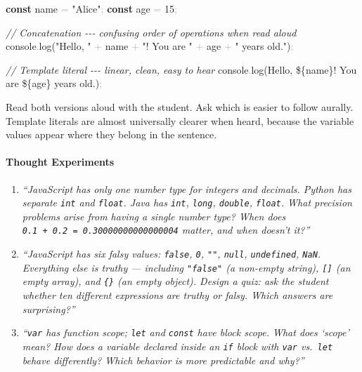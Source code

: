 \documentclass[
  justified,
  openright,
]{tufte-book}
\let\paragraph\paragraph
\newcommand{\KeywordTok}[1]{\textcolor{CodeKeyword}{\textbf{#1}}}  %
\newcommand{\StringTok}[1]{\textcolor{CodeString}{#1}}              %
\newcommand{\CommentTok}[1]{\textcolor{CodeComment}{\textit{#1}}}  %
\newcommand{\CodeNumTok}[1]{\textcolor{CodeNumber}{#1}}             %
\newcommand{\CodeFuncTok}[1]{\textcolor{CodeKeyword}{#1}}           %
\newcommand{\OperatorTok}[1]{\textcolor{DarkGray}{#1}}              %
\newenvironment{Shaded}{%
  \begin{mdframed}[style=TufteCode]%
}{%
  \end{mdframed}%
}
\let\paragraph\paragraph
\begin{document}
\begin{Shaded}
\begin{Highlighting}[]
\KeywordTok{const} name \OperatorTok{=} \StringTok{"Alice"}\OperatorTok{;}
\KeywordTok{const} age \OperatorTok{=} \CodeNumTok{15}\OperatorTok{;}
 
\CommentTok{// Concatenation {-}{-}{-} confusing order of operations when read aloud}
console\OperatorTok{.}\CodeFuncTok{log}(\StringTok{"Hello, "} \OperatorTok{+} name \OperatorTok{+} \StringTok{"! You are "} \OperatorTok{+} age \OperatorTok{+} \StringTok{" years old."})\OperatorTok{;}
 
\CommentTok{// Template literal {-}{-}{-} linear, clean, easy to hear}
console\OperatorTok{.}\CodeFuncTok{log}(\StringTok{\textasciigrave{}Hello, }\StringTok{\$\{}name\StringTok{\}}\StringTok{! You are }\StringTok{\$\{}age\StringTok{\}}\StringTok{ years old.\textasciigrave{}})\OperatorTok{;}
\end{Highlighting}
\end{Shaded}

Read both versions aloud with the student. Ask which is easier to follow
aurally. Template literals are almost universally clearer when heard,
because the variable values appear where they belong in the sentence.

\paragraph{Thought Experiments}\label{thought-experiments-19}

\begin{enumerate}
\def\labelenumi{\arabic{enumi}.}
\item
  \emph{``JavaScript has only one number type for integers and decimals.
  Python has separate \texttt{int} and \texttt{float}. Java has
  \texttt{int}, \texttt{long}, \texttt{double}, \texttt{float}. What
  precision problems arise from having a single number type? When does
  \texttt{0.1\ +\ 0.2\ =\ 0.30000000000000004} matter, and when doesn't
  it?''}
\item
  \emph{``JavaScript has six falsy values: \texttt{false}, \texttt{0},
  \texttt{""}, \texttt{null}, \texttt{undefined}, \texttt{NaN}.
  Everything else is truthy --- including \texttt{"false"} (a non-empty
  string), \texttt{{[}{]}} (an empty array), and \texttt{\{\}} (an empty
  object). Design a quiz: ask the student whether ten different
  expressions are truthy or falsy. Which answers are surprising?''}
\item
  \emph{``\texttt{var} has function scope; \texttt{let} and
  \texttt{const} have block scope. What does `scope' mean? How does a
  variable declared inside an \texttt{if} block with \texttt{var}
  vs.~\texttt{let} behave differently? Which behavior is more
  predictable and why?''}
\end{enumerate}
\end{document}
